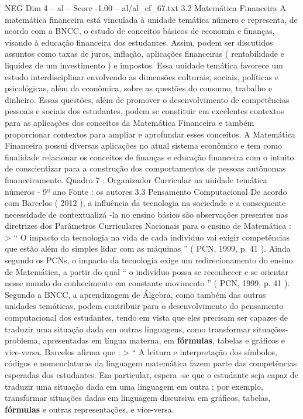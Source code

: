 \begin{textsample}{NEG Dim 4 – al – Score -1.00 – al/al\_ef\_67.txt}  \label{ex:f4_neg_249}
3.2 Matemática Financeira A matemática financeira está vinculada à unidade temática número e representa, de acordo com a BNCC, o estudo de conceitos básicos de economia e finanças, visando à educação financeira dos estudantes.
Assim, podem ser discutidos assuntos como taxas de juros, inflação, aplicações financeiras ( rentabilidade e liquidez de um investimento ) e impostos.
Essa unidade temática favorece um estudo interdisciplinar envolvendo as dimensões culturais, sociais, políticas e psicológicas, além da econômica, sobre as questões do consumo, trabalho e dinheiro.
Essas questões, além de promover o desenvolvimento de competências pessoais e sociais dos estudantes, podem se constituir em excelentes contextos para as aplicações dos conceitos da Matemática Financeira e também proporcionar contextos para ampliar e aprofundar esses conceitos.
A Matemática Financeira possui diversas aplicações no atual sistema econômico e tem como finalidade relacionar os conceitos de finanças e educação financeira com o intuito de conscientizar para a construção dos comportamentos de pessoas autônomas financeiramente.
Quadro 7 : Organizador Curricular na unidade temática números - 9º ano Fonte : os autores 3.3 Pensamento Computacional De acordo com Barcelos ( 2012 ), a influência da tecnologia na sociedade e a consequente necessidade de contextualizá -la no ensino básico são observações presentes nas diretrizes dos Parâmetros Curriculares Nacionais para o ensino de Matemática : > “ O impacto da tecnologia na vida de cada indivíduo vai exigir competências que estão além do simples lidar com as máquinas ” ( PCN, 1999, p. 41 ).
Ainda segundo os PCNs, o impacto da tecnologia exige um redirecionamento do ensino de Matemática, a partir do qual “ o indivíduo possa se reconhecer e se orientar nesse mundo do conhecimento em constante movimento ” ( PCN, 1999, p. 41 ).
Segundo a BNCC, a aprendizagem de Álgebra, como também das outras unidades temáticas, podem contribuir para o desenvolvimento do pensamento computacional dos estudantes, tendo em vista que eles precisam ser capazes de traduzir uma situação dada em outras linguagens, como transformar situações-problema, apresentadas em língua materna, em \textbf{fórmulas}, tabelas e gráficos e vice-versa.
Barcelos afirma que : > “ A leitura e interpretação dos símbolos, códigos e nomenclaturas da linguagem matemática fazem parte das competências esperadas dos estudantes.
Em particular, espera -se que o estudante seja capaz de traduzir uma situação dada em uma linguagem em outra ; por exemplo, transformar situações dadas em linguagem discursiva em gráficos, tabelas, \textbf{fórmulas} e outras representações, e vice-versa.

\end{textsample}
